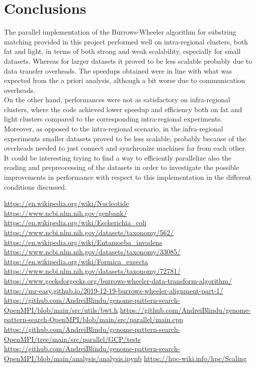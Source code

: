 \documentclass[final,5p,times,twocolumn,authoryear]{elsarticle}
\begin{document}
\section{Conclusions}
The parallel implementation of the Burrows-Wheeler algorithm for substring matching provided in this project performed well on intra-regional clusters, both fat and light, in terms of both strong and weak scalability, especially for small datasets. Whereas for larger datasets it proved to be less scalable probably due to data transfer overheads. The speedups obtained were in line with what was expected from the a priori analysis, although a bit worse due to communication overheads. \\
On the other hand, performances were not as satisfactory on infra-regional clusters, where the code achieved lower speedup and efficiency both on fat and light clusters compared to the corresponding intra-regional experiments. Moreover, as opposed to the intra-regional scenario, in the infra-regional experiments smaller datasets proved to be less scalable, probably because of the overheads needed to just connect and synchronize machines far from each other. \\
It could be interesting trying to find a way to efficiently parallelize also the reading and prepreocessing of the datasets in order to investigate the possible improvements in performance with respect to this implementation in the different conditions discussed.

\def\UrlBreaks{\do\/\do-}
\begin{thebibliography}{9}
 \url{https://en.wikipedia.org/wiki/Nucleotide}
 \url{https://www.ncbi.nlm.nih.gov/genbank/}
 \url{https://en.wikipedia.org/wiki/Escherichia_coli}
 \url{https://www.ncbi.nlm.nih.gov/datasets/taxonomy/562/}
 \url{https://en.wikipedia.org/wiki/Entamoeba_invadens}
 \url{https://www.ncbi.nlm.nih.gov/datasets/taxonomy/33085/}
 \url{https://en.wikipedia.org/wiki/Formica_exsecta}
 \url{https://www.ncbi.nlm.nih.gov/datasets/taxonomy/72781/}
\url{https://www.geeksforgeeks.org/burrows-wheeler-data-transform-algorithm/}
\url{https://mr-easy.github.io/2019-12-19-burrows-wheeler-alignment-part-1/}
\url{https://github.com/AndreiBlindu/genome-pattern-search-OpenMPI/blob/main/src/utils/bwt.h}
\url{https://github.com/AndreiBlindu/genome-pattern-search-OpenMPI/blob/main/src/parallel/main.cpp}
\url{https://github.com/AndreiBlindu/genome-pattern-search-OpenMPI/tree/main/src/parallel/GCP/tests}
\url{https://github.com/AndreiBlindu/genome-pattern-search-OpenMPI/blob/main/analysis/analysis.ipynb}
\url{https://hpc-wiki.info/hpc/Scaling}
\end{thebibliography}
\end{document}
